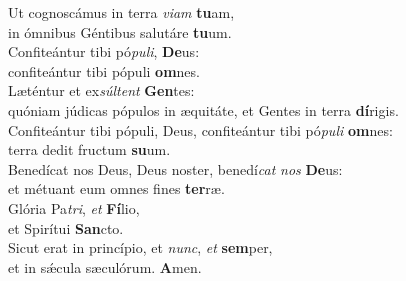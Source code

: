 \evenverse Ut cognoscámus in terra \textit{vi}\textit{am} \textbf{tu}am,~\*\\
\evenverse in ómnibus Géntibus salutáre \textbf{tu}um.\\
\oddverse Confiteántur tibi pó\textit{pu}\textit{li}, \textbf{De}us:~\*\\
\oddverse confiteántur tibi pópuli \textbf{om}nes.\\
\evenverse Læténtur et ex\textit{súl}\textit{tent} \textbf{Gen}tes:~\*\\
\evenverse quóniam júdicas pópulos in æquitáte, et Gentes in terra \textbf{dí}rigis.\\
\oddverse Confiteántur tibi pópuli, Deus, confiteántur tibi pó\textit{pu}\textit{li} \textbf{om}nes:~\*\\
\oddverse terra dedit fructum \textbf{su}um.\\
\evenverse Benedícat nos Deus, Deus noster, benedí\textit{cat} \textit{nos} \textbf{De}us:~\*\\
\evenverse et métuant eum omnes fines \textbf{ter}ræ.\\
\oddverse Glória Pa\textit{tri}, \textit{et} \textbf{Fí}lio,~\*\\
\oddverse et Spirítui \textbf{San}cto.\\
\evenverse Sicut erat in princípio, et \textit{nunc}, \textit{et} \textbf{sem}per,~\*\\
\evenverse et in sǽcula sæculórum. \textbf{A}men.\\
